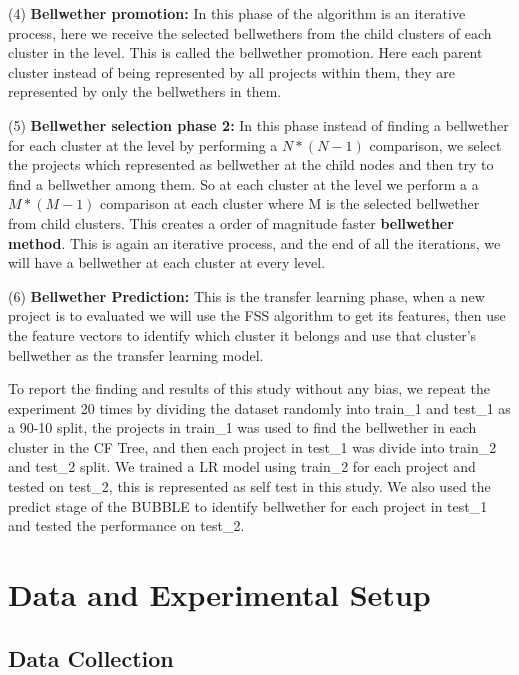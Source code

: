 \documentclass[10pt,journal,compsoc]{IEEEtran}
\begin{document}
    (4) \textbf{Bellwether promotion:} In this phase of the algorithm is an iterative process, here we receive the selected bellwethers from the child clusters of each cluster in the level. This is called the bellwether promotion. Here each parent cluster instead of being represented by all projects within them, they are represented by only the bellwethers in them.  
    
    (5) \textbf{Bellwether selection phase 2:} In this phase instead of finding a bellwether for each cluster at the level by performing a $ N*(N-1) $ comparison, we select the projects which represented as bellwether at the child nodes and then try to find a bellwether among them. So at each cluster at the level we perform a a $ M*(M-1) $ comparison at each cluster where M is the selected bellwether from child clusters. This creates a order of magnitude faster \textbf{bellwether method}. This is again an iterative process, and the end of all the iterations, we will have a bellwether at each cluster at every level. 
    
    (6) \textbf{Bellwether Prediction:} This is the transfer learning phase, when a new project is to evaluated we will use the FSS algorithm to get its features, then use the feature vectors to identify which cluster it belongs and use that cluster's bellwether as the transfer learning model.


To report the finding and results of this study without any bias, we repeat the experiment 20 times by dividing the dataset randomly into train\_1 and test\_1 as a 90-10 split, the projects in train\_1 was used to find the bellwether in each cluster in the CF Tree, and then each project in test\_1 was divide into train\_2 and test\_2 split. We trained a LR model using train\_2 for each project and tested on test\_2, this is represented as self test in this study. We also used the predict stage of the BUBBLE to identify bellwether for each project in test\_1 and tested the performance on test\_2. 



\section{Data and Experimental Setup}
\label{sec:Data Collection}

\subsection{Data Collection}
\label{sec:data}
\end{document}
